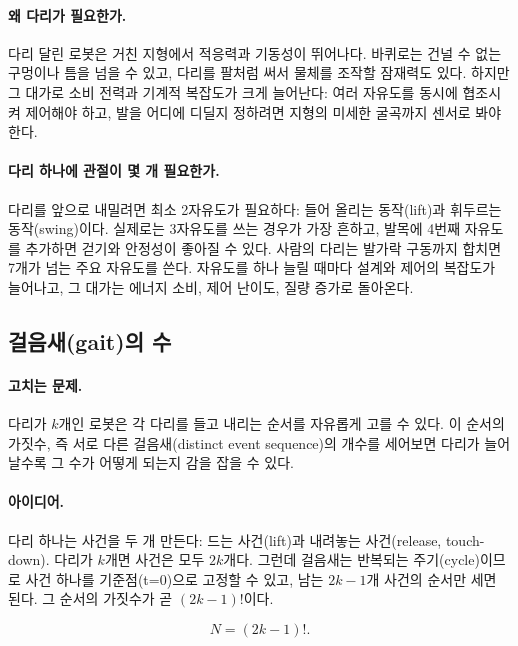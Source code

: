\paragraph{왜 다리가 필요한가.}
다리 달린 로봇은 거친 지형에서 적응력과 기동성이 뛰어나다. 바퀴로는 건널 수
없는 구멍이나 틈을 넘을 수 있고, 다리를 팔처럼 써서 물체를 조작할 잠재력도
있다. 하지만 그 대가로 소비 전력과 기계적 복잡도가 크게 늘어난다: 여러 자유도를
동시에 협조시켜 제어해야 하고, 발을 어디에 디딜지 정하려면 지형의 미세한 굴곡까지
센서로 봐야 한다.

\paragraph{다리 하나에 관절이 몇 개 필요한가.}
다리를 앞으로 내밀려면 최소 2자유도가 필요하다: 들어 올리는 동작(lift)과 휘두르는
동작(swing)이다. 실제로는 3자유도를 쓰는 경우가 가장 흔하고, 발목에 4번째
자유도를 추가하면 걷기와 안정성이 좋아질 수 있다. 사람의 다리는 발가락 구동까지
합치면 7개가 넘는 주요 자유도를 쓴다.
자유도를 하나 늘릴 때마다 설계와 제어의 복잡도가 늘어나고, 그 대가는 에너지
소비, 제어 난이도, 질량 증가로 돌아온다.

\subsection{걸음새(gait)의 수}
\label{sec:lec02-gaits}

\paragraph{고치는 문제.}
다리가 $k$개인 로봇은 각 다리를 들고 내리는 순서를 자유롭게 고를 수 있다. 이
순서의 가짓수, 즉 서로 다른 걸음새(distinct event sequence)의 개수를 세어보면
다리가 늘어날수록 그 수가 어떻게 되는지 감을 잡을 수 있다.

\paragraph{아이디어.}
다리 하나는 사건을 두 개 만든다: 드는 사건(lift)과 내려놓는 사건(release,
touch-down). 다리가 $k$개면 사건은 모두 $2k$개다. 그런데 걸음새는 반복되는
주기(cycle)이므로 사건 하나를 기준점(t=0)으로 고정할 수 있고, 남는 $2k-1$개
사건의 순서만 세면 된다. 그 순서의 가짓수가 곧 $(2k-1)!$이다.

\begin{equation}
\label{eq:lec02-gaits}
N = (2k - 1)!.
\end{equation}

